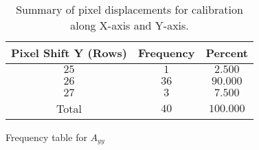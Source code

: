 \begin{table}[h]
    \vspace{10pt}

    \begin{subtable}{\textwidth}
        \centering
        \footnotesize
        {
            \begin{tabular}{ccc}
                \toprule
                Pixel Shift Y (Rows) & Frequency & Percent \\
                \midrule
                $25$ & $1$ & $2.500$  \\
                $26$ & $36$ & $90.000$  \\
                $27$ & $3$ & $7.500$  \\
                Total & $40$ & $100.000$ \\
                \bottomrule
            \end{tabular}
        }
        \caption{Frequency table for $A_{yy}$}
        \label{subtable:freq_table_ayy}
    \end{subtable}

    \caption{Summary of pixel displacements for calibration along X-axis and Y-axis.}
    \label{table:freq_table_calib_xy}
\end{table}

